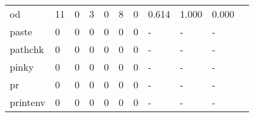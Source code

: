 \begin{longtable}{lp{1.2cm}p{1.2cm}p{1.2cm}p{1.2cm}p{1.2cm}p{1.2cm}p{1.2cm}p{1.2cm}p{1.2cm}p{1.2cm}}
od        &                                    11 &                                                  0 &                                                  3 &                                                  0 &                                                  8 &                                                  0 &                                              0.614 &                                              1.000 &                                              0.000 \\
paste     &                                     0 &                                                  0 &                                                  0 &                                                  0 &                                                  0 &                                                  0 &                                                  - &                                                  - &                                                  - \\
pathchk   &                                     0 &                                                  0 &                                                  0 &                                                  0 &                                                  0 &                                                  0 &                                                  - &                                                  - &                                                  - \\
pinky     &                                     0 &                                                  0 &                                                  0 &                                                  0 &                                                  0 &                                                  0 &                                                  - &                                                  - &                                                  - \\
pr        &                                     0 &                                                  0 &                                                  0 &                                                  0 &                                                  0 &                                                  0 &                                                  - &                                                  - &                                                  - \\
printenv  &                                     0 &                                                  0 &                                                  0 &                                                  0 &                                                  0 &                                                  0 &                                                  - &                                                  - &                                                  - \\

\end{longtable}
